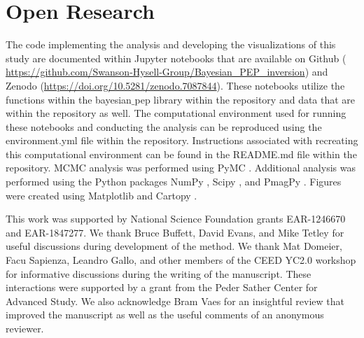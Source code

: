\documentclass[]{agujournal2019}
\begin{document}
\section*{Open Research}
The code implementing the analysis and developing the visualizations of this study are documented within Jupyter notebooks \cite{Kluyver2016a} that are available on Github ( \url{https://github.com/Swanson-Hysell-Group/Bayesian_PEP_inversion}) and Zenodo (\url{https://doi.org/10.5281/zenodo.7087844}). These notebooks utilize the functions within the bayesian$\_$pep library within the repository and data that are within the repository as well. The computational environment used for running these notebooks and conducting the analysis can be reproduced using the environment.yml file within the repository. Instructions associated with recreating this computational environment can be found in the README.md file within the repository. MCMC analysis was performed using PyMC \cite{Salvatier2016a}. Additional analysis was performed using the Python packages NumPy \cite{Harris2020a}, Scipy \cite{Virtanen2020a}, and PmagPy \cite{Tauxe2016a}. Figures were created using Matplotlib \cite{Hunter2007a} and Cartopy \cite{Met-Office2010a}.

\acknowledgments
This work was supported by National Science Foundation grants EAR-1246670 and EAR-1847277. We thank Bruce Buffett, David Evans, and Mike Tetley for useful discussions during development of the method. We thank Mat Domeier, Facu Sapienza, Leandro Gallo, and other members of the CEED YC2.0 workshop for informative discussions during the writing of the manuscript. These interactions were supported by a grant from the Peder Sather Center for Advanced Study. We also acknowledge Bram Vaes for an insightful review that improved the manuscript as well as the useful comments of an anonymous reviewer. 
\clearpage




%


%

\end{document}
